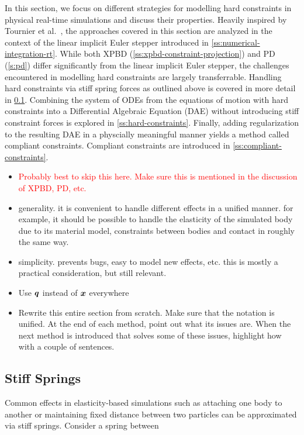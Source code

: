 In this section, we focus on different strategies for modelling hard constraints in physical real-time simulations and discuss 
their properties. Heavily inspired by Tournier et al.\ \cite{tournier2015}, the approaches covered in this section are analyzed 
in the context of the linear implicit Euler stepper introduced in \cref{ss:numerical-integration-rt}. While both XPBD 
(\cref{ss:xpbd-constraint-projection}) and PD (\cref{s:pd}) differ significantly from the linear implicit Euler stepper, the challenges
encountered in modelling hard constraints are largely transferrable. Handling hard constraints via stiff spring forces as outlined 
above is covered in more detail in \cref{ss:stiff-springs}. Combining the
system of ODEs from the equations of motion with hard constraints into a Differential Algebraic Equation (DAE) without introducing stiff 
constraint forces is explored in \cref{ss:hard-constraints}. Finally, adding regularization to the resulting DAE in a physcially 
meaningful manner yields a method called compliant constraints. Compliant constraints are introduced in \cref{ss:compliant-constraints}.

\begin{itemize}
    \item \textcolor{red}{Probably best to skip this here. Make sure this is mentioned in the discussion of XPBD, PD, etc.}
    \item generality. it is convenient to handle different effects in a unified manner. for example, it should be possible to handle 
        the elasticity of the simulated body due to its material model, constraints between bodies and contact in roughly the same way.
    \item simplicity. prevents bugs, easy to model new effects, etc. this is mostly a practical consideration, but still relevant.
\end{itemize}

\begin{itemize}
    \item Use $\bm{q}$ instead of $\bm{x}$ everywhere
    \item Rewrite this entire section from scratch. Make sure that the notation is unified. At the end of each method,
        point out what its issues are. When the next method is introduced that solves some of these issues, highlight
        how with a couple of sentences.
\end{itemize}

\subsection{Stiff Springs}\label{ss:stiff-springs}
Common effects in elasticity-based simulations such as attaching one body to another or maintaining fixed distance between two 
particles can be approximated via stiff springs. Consider a spring between 

